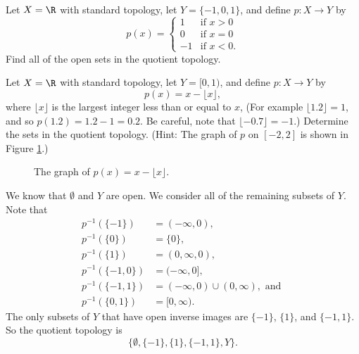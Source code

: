 \begin{activity} ~
\ba
\item Let $X=\R$ with standard topology, let $Y=\{-1,0,1\}$, and define $p:X \to Y$ by 
\[p(x) = \begin{cases} 1&\text{if } x>0 \\ 0 &\text{if } x=0 \\ -1 &\text{if } x<0. \end{cases}\]
Find all of the open sets in the quotient topology. 

\item Let $X=\R$ with standard topology, let $Y=[0,1)$, and define $p:X \to Y$ by 
\[p(x) = x-\lfloor x\rfloor,\]
where $\lfloor x\rfloor$ is the largest integer less than or equal to $x$, (For example $\lfloor 1.2 \rfloor = 1$, and so $p(1.2) = 1.2 - 1 = 0.2$. Be careful, note that $\lfloor -0.7 \rfloor = -1$.)  Determine the sets in the quotient topology.  (Hint: The graph of $p$ on $[-2,2]$ is shown in Figure \ref{F:floor}.)
\begin{figure}[h]
\begin{center}
\caption{The graph of $p(x) = x - \lfloor x\rfloor$.} 
\label{F:floor}
\end{center}
\end{figure}


\ea

\end{activity}


\ActivitySolution
\ba
\item We know that $\emptyset$ and $Y$ are open. We consider all of the remaining subsets of $Y$. Note that 
\begin{align*}
p^{-1}(\{-1\}) &= (-\infty, 0), \\
p^{-1}(\{0\}) &= \{0\}, \\
p^{-1}(\{1\}) &= (0,\infty, 0), \\
p^{-1}(\{-1,0\}) &= (-\infty, 0], \\
p^{-1}(\{-1,1\}) &= (-\infty, 0) \cup (0, \infty), \text{ and } \\
p^{-1}(\{0,1\}) &= [0,\infty).
\end{align*}
The only subsets of $Y$ that have open inverse images are $\{-1\}$, $\{1\}$, and $\{-1,1\}$. So the quotient topology is
\[\{\emptyset, \{-1\}, \{1\}, \{-1,1\}, Y\}.\]

